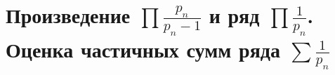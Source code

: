 \section{Произведение $\prod \frac{p_n}{p_n - 1}$ и ряд $\prod \frac{1}{p_n}$. Оценка частичных сумм ряда $\sum \frac{1}{p_n}$}
